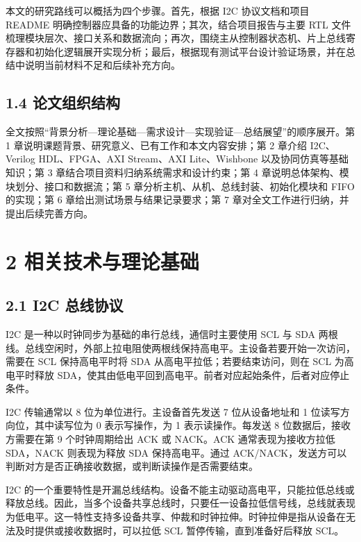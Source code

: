 本文的研究路线可以概括为四个步骤。首先，根据 I2C 协议文档和项目 README
明确控制器应具备的功能边界；其次，结合项目报告与主要 RTL
文件梳理模块层次、接口关系和数据流向；再次，围绕主从控制器状态机、片上总线寄存器和初始化逻辑展开实现分析；最后，根据现有测试平台设计验证场景，并在总结中说明当前材料不足和后续补充方向。

\subsection{1.4
论文组织结构}\label{ux8bbaux6587ux7ec4ux7ec7ux7ed3ux6784}

全文按照``背景分析---理论基础---需求设计---实现验证---总结展望''的顺序展开。第
1 章说明课题背景、研究意义、已有工作和本文内容安排；第 2 章介绍
I2C、Verilog HDL、FPGA、AXI Stream、AXI Lite、Wishbone
以及协同仿真等基础知识；第 3 章结合项目资料归纳系统需求和设计约束；第 4
章说明总体架构、模块划分、接口和数据流；第 5
章分析主机、从机、总线封装、初始化模块和 FIFO 的实现；第 6
章给出测试场景与结果记录要求；第 7
章对全文工作进行归纳，并提出后续完善方向。

\section{2
相关技术与理论基础}\label{ux76f8ux5173ux6280ux672fux4e0eux7406ux8bbaux57faux7840}

\subsection{2.1 I2C 总线协议}\label{i2c-ux603bux7ebfux534fux8bae}

I2C 是一种以时钟同步为基础的串行总线，通信时主要使用 SCL 与 SDA
两根线。总线空闲时，外部上拉电阻使两根线保持高电平。主设备若要开始一次访问，需要在
SCL 保持高电平时将 SDA 从高电平拉低；若要结束访问，则在 SCL
为高电平时释放
SDA，使其由低电平回到高电平。前者对应起始条件，后者对应停止条件。

I2C 传输通常以 8 位为单位进行。主设备首先发送 7 位从设备地址和 1
位读写方向位，其中读写位为 0 表示写操作，为 1 表示读操作。每发送 8
位数据后，接收方需要在第 9 个时钟周期给出 ACK 或 NACK。ACK
通常表现为接收方拉低 SDA，NACK 则表现为释放 SDA 保持高电平。通过
ACK/NACK，发送方可以判断对方是否正确接收数据，或判断读操作是否需要结束。

I2C
的一个重要特性是开漏总线结构。设备不能主动驱动高电平，只能拉低总线或释放总线。因此，当多个设备共享总线时，只要任一设备拉低信号线，总线就表现为低电平。这一特性支持多设备共享、仲裁和时钟拉伸。时钟拉伸是指从设备在无法及时提供或接收数据时，可以拉低
SCL 暂停传输，直到准备好后释放 SCL。

